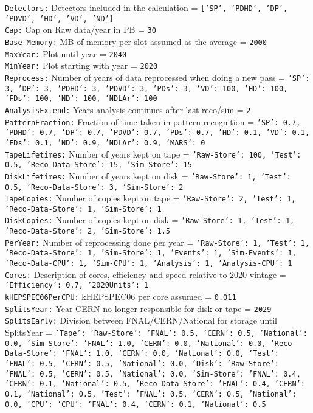 {\tt Detectors:} Detectors included in the calculation = {\tt ['SP', 'PDHD', 'DP', 'PDVD', 'HD', 'VD', 'ND']} \\
{\tt Cap:} Cap on Raw data/year in PB = {\tt 30} \\
{\tt Base-Memory:} MB of memory per slot assumed as the average = {\tt 2000} \\
{\tt MaxYear:} Plot until year = {\tt 2040} \\
{\tt MinYear:} Plot starting with year = {\tt 2020} \\
{\tt Reprocess:} Number of years of data reprocessed when doing a new pass = {\tt {'SP': 3, 'DP': 3, 'PDHD': 3, 'PDVD': 3, 'PDs': 3, 'VD': 100, 'HD': 100, 'FDs': 100, 'ND': 100, 'NDLAr': 100}} \\
{\tt AnalysisExtend:} Years analysis continues after last reco/sim = {\tt 2} \\
{\tt PatternFraction:} Fraction of time taken in pattern recognition = {\tt {'SP': 0.7, 'PDHD': 0.7, 'DP': 0.7, 'PDVD': 0.7, 'PDs': 0.7, 'HD': 0.1, 'VD': 0.1, 'FDs': 0.1, 'ND': 0.9, 'NDLAr': 0.9, 'MARS': 0}} \\
{\tt TapeLifetimes:} Number of years kept on tape = {\tt {'Raw-Store': 100, 'Test': 0.5, 'Reco-Data-Store': 15, 'Sim-Store': 15}} \\
{\tt DiskLifetimes:} Number of years kept on disk = {\tt {'Raw-Store': 1, 'Test': 0.5, 'Reco-Data-Store': 3, 'Sim-Store': 2}} \\
{\tt TapeCopies:} Number of copies kept on tape = {\tt {'Raw-Store': 2, 'Test': 1, 'Reco-Data-Store': 1, 'Sim-Store': 1}} \\
{\tt DiskCopies:} Number of copies kept on disk = {\tt {'Raw-Store': 1, 'Test': 1, 'Reco-Data-Store': 2, 'Sim-Store': 1.5}} \\
{\tt PerYear:} Number of reprocessing done per year = {\tt {'Raw-Store': 1, 'Test': 1, 'Reco-Data-Store': 1, 'Sim-Store': 1, 'Events': 1, 'Sim-Events': 1, 'Reco-Data-CPU': 1, 'Sim-CPU': 1, 'Analysis': 1, 'Analysis-CPU': 1}} \\
{\tt Cores:} Description of cores, efficiency and speed relative to 2020 vintage = {\tt {'Efficiency': 0.7, '2020Units': 1}} \\
{\tt kHEPSPEC06PerCPU:} kHEPSPEC06 per core assumed = {\tt 0.011} \\
{\tt SplitsYear:} Year CERN no longer responsible for disk or tape = {\tt 2029} \\
{\tt SplitsEarly:} Division between FNAL/CERN/National for storage until SplitsYear = {\tt {'Tape': {'Raw-Store': {'FNAL': 0.5, 'CERN': 0.5, 'National': 0.0}, 'Sim-Store': {'FNAL': 1.0, 'CERN': 0.0, 'National': 0.0}, 'Reco-Data-Store': {'FNAL': 1.0, 'CERN': 0.0, 'National': 0.0}, 'Test': {'FNAL': 0.5, 'CERN': 0.5, 'National': 0.0}}, 'Disk': {'Raw-Store': {'FNAL': 0.5, 'CERN': 0.5, 'National': 0.0}, 'Sim-Store': {'FNAL': 0.4, 'CERN': 0.1, 'National': 0.5}, 'Reco-Data-Store': {'FNAL': 0.4, 'CERN': 0.1, 'National': 0.5}, 'Test': {'FNAL': 0.5, 'CERN': 0.5, 'National': 0.0}}, 'CPU': {'CPU': {'FNAL': 0.4, 'CERN': 0.1, 'National': 0.5}}}} \\
